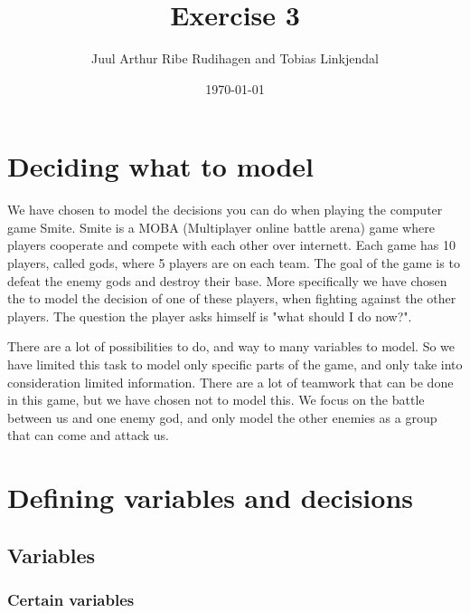 \documentclass[titlepage]{article}
\author{Juul Arthur Ribe Rudihagen and Tobias Linkjendal}
\title{Exercise 3}
\date{\today}
\begin{document}
\maketitle


\tableofcontents

\newpage


\section{Deciding what to model}
We have chosen to model the decisions you can do when playing the computer game Smite. Smite is a MOBA (Multiplayer online battle arena) game where players cooperate and compete with each other over internett. Each game has 10 players, called gods, where 5 players are on each team. The goal of the game is to defeat the enemy gods and destroy their base. More specifically we have chosen the to model the decision of one of these players, when fighting against the other players. The question the player asks himself is "what should I do now?".

There are a lot of possibilities to do, and way to many variables to model. So we have limited this task to model only specific parts of the game, and only take into consideration limited information. There are a lot of teamwork that can be done in this game, but we have chosen not to model this. We focus on the battle between us and one enemy god, and only model the other enemies as a group that can come and attack us.


\section{Defining variables and decisions}

\subsection{Variables}
\subsubsection{Certain variables}
\end{document}
